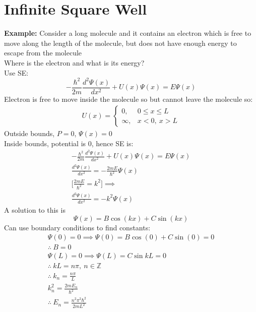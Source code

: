 \documentclass[a4paper, 11pt, fleqn, normalem]{report}
\begin{document}
\section{Infinite Square Well}
\textbf{Example: }Consider a long molecule and it contains an electron which is free to move along the length of the molecule, but does not have enough energy to escape from the molecule \\
Where is the electron and what is its energy? \\
Use SE:
\begin{equation*}
     -\frac{\hbar^{2}}{2m}\frac{d^{2} \Psi(x)}{d x^{2}} + U(x)\Psi(x) = E\Psi(x)
\end{equation*}
Electron is free to move inside the molecule so but cannot leave the molecule so:
\begin{gather*}
    U(x) =
    \begin{cases}
        0,      & 0 \leq x \leq L \\
        \infty, & x < 0,~x > L
    \end{cases}
\end{gather*}
Outside bounds, $P = 0$, $\Psi(x) = 0$ \\
Inside bounds, potential is 0, hence SE is:
\begin{gather*}
    -\frac{\hbar^{2}}{2m}\frac{d^{2} \Psi(x)}{d x^{2}} + U(x)\Psi(x) = E\Psi(x) \\
    \frac{d^{2} \Psi(x)}{d x^{2}} = -\frac{2mE}{\hbar^{2}}\Psi(x) \\
    \Big[\frac{2mE}{\hbar^{2}} = k^{2}\Big] \implies \\
    \frac{d^{2} \Psi(x)}{d x^{2}} = -k^{2}\Psi(x)
\end{gather*}
A solution to this is
\begin{equation*}
    \Psi(x) = B\cos(kx) + C\sin(kx)
\end{equation*}
Can use boundary conditions to find constants:
\begin{gather*}
    \Psi(0) = 0 \implies \Psi(0) = B\cos(0) + C\sin(0) = 0 \\
    \therefore ~ B = 0 \\
    \Psi(L) = 0 \implies \Psi(L) = C\sin{kL} = 0 \\
    \therefore ~ kL = n\pi,~n \in \mathbb{Z} \\
    \therefore ~ k_{n} = \frac{n\pi}{L} \\
    k_{n}^{2} = \frac{2mE_{n}}{\hbar^{2}} \\
    \therefore ~ E_{n} = \frac{n^{2}\pi^{2}\hbar^{2}}{2mL^{2}}
\end{gather*}
\end{document}
